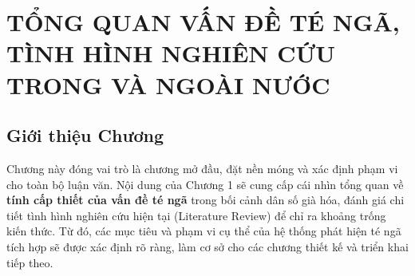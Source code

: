 \chapter[TỔNG QUAN VẤN ĐỀ TÉ NGÃ]{TỔNG QUAN VẤN ĐỀ TÉ NGÃ, TÌNH HÌNH NGHIÊN CỨU TRONG VÀ NGOÀI NƯỚC}
\label{chap:introduction} %

\section*{Giới thiệu Chương} %
Chương này đóng vai trò là chương mở đầu, đặt nền móng và xác định phạm vi cho toàn bộ luận văn. Nội dung của Chương 1 sẽ cung cấp cái nhìn tổng quan về \textbf{tính cấp thiết của vấn đề té ngã} trong bối cảnh dân số già hóa, đánh giá chi tiết tình hình nghiên cứu hiện tại (Literature Review) để chỉ ra khoảng trống kiến thức. Từ đó, các mục tiêu và phạm vi cụ thể của hệ thống phát hiện té ngã tích hợp sẽ được xác định rõ ràng, làm cơ sở cho các chương thiết kế và triển khai tiếp theo.







